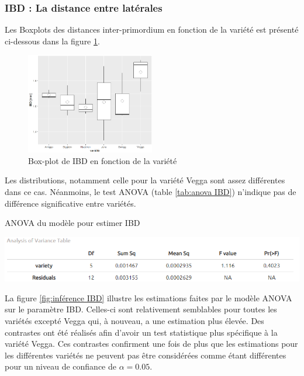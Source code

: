 \subsubsection{IBD : La distance entre latérales}

Les Boxplots des distances inter-primordium en fonction de la variété est présenté ci-dessous dans la figure \ref{fig:boxplot IBD}.

\begin{figure}[ht]
\centering
\includegraphics[width=0.5\textwidth]{Image/boxplot IBD.png}
\caption{Box-plot de IBD en fonction de la variété}
\label{fig:boxplot IBD}
\end{figure}

Les distributions, notamment celle pour la variété Vegga sont assez différentes dans ce cas.
Néanmoins, le test ANOVA (table \ref{tab:anova IBD}) n'indique pas de différence significative entre variétés.

\begin{table}[ht]
    \centering
    \caption{ANOVA du modèle pour estimer IBD}
    \includegraphics[width=1\textwidth]{Image/anova IBD.png}
    \label{tab:anova IBD}
\end{table}

La figure \ref{fig:inférence IBD} illustre les estimations faites par le modèle ANOVA sur le paramètre IBD.
Celles-ci sont relativement semblables pour toutes les variétés excepté Vegga qui, à nouveau, a une estimation plus élevée.
Des contrastes ont été réalisés afin d'avoir un test statistique plus spécifique à la variété Vegga.
Ces contrastes confirment une fois de plus que les estimations pour les différentes variétés ne peuvent pas être considérées comme étant différentes pour un niveau de confiance de $\alpha = 0.05$.

